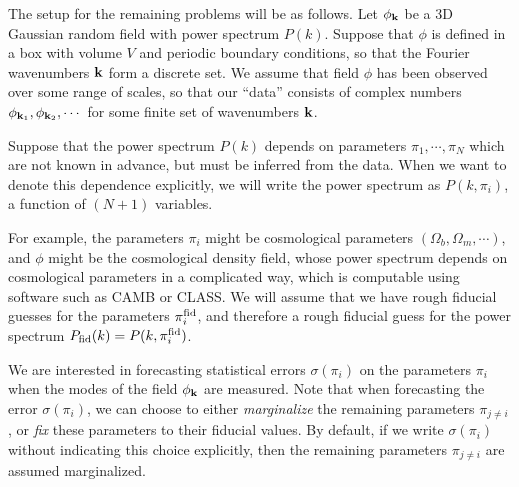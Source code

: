 \documentclass[aps,prd,superscriptaddress,groupedaddress,nofootinbib,nobibnotes]{revtex4}
\def\k{{\bf k}}
\begin{document}
\medskip\par\noindent
The setup for the remaining problems will be as follows.
Let $\phi_{\k}$ be a 3D Gaussian random field with power spectrum $P(k)$.
Suppose that $\phi$ is defined in a box with volume $V$ and periodic boundary conditions, so that the Fourier wavenumbers $\k$ form a discrete set.
We assume that field $\phi$ has been observed over some range of scales, so that our ``data'' consists of
complex numbers $\phi_{\k_1}, \phi_{\k_2}, \cdots$ for some finite set of wavenumbers $\k$.

Suppose that the power spectrum $P(k)$ depends on parameters $\pi_1, \cdots, \pi_N$ which are not known in advance, 
but must be inferred from the data.
When we want to denote this dependence explicitly, we will write the power spectrum as $P(k,\pi_i)$,
a function of $(N+1)$ variables.

For example, the parameters $\pi_i$ might be cosmological parameters $(\Omega_b, \Omega_m, \cdots)$,
and $\phi$ might be the cosmological density field, whose power spectrum depends on cosmological parameters
in a complicated way, which is computable using software such as CAMB or CLASS.
We will assume that we have rough fiducial guesses for the parameters $\pi_i^{\rm fid}$, and therefore a rough
fiducial guess for the power spectrum $P_{\rm fid}(k) = P(k,\pi_i^{\rm fid})$.

We are interested in forecasting statistical errors $\sigma(\pi_i)$ on the parameters $\pi_i$
when the modes of the field $\phi_{\k}$ are measured.
Note that when forecasting the error $\sigma(\pi_i)$, we can choose to either {\em marginalize}
the remaining parameters $\pi_{j\ne i}$, or {\em fix} these parameters to their fiducial values.
By default, if we write $\sigma(\pi_i)$ without indicating this choice explicitly, then the
remaining parameters $\pi_{j\ne i}$ are assumed marginalized.
\end{document}
